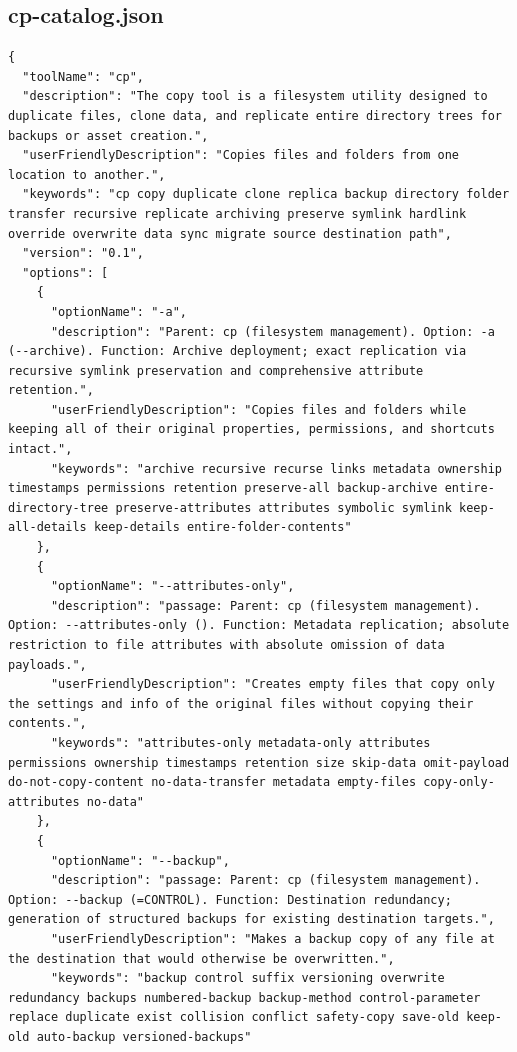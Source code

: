\begin{appendix}
\subsection{cp-catalog.json}
\begin{lstlisting}
{
  "toolName": "cp",
  "description": "The copy tool is a filesystem utility designed to duplicate files, clone data, and replicate entire directory trees for backups or asset creation.",
  "userFriendlyDescription": "Copies files and folders from one location to another.",
  "keywords": "cp copy duplicate clone replica backup directory folder transfer recursive replicate archiving preserve symlink hardlink override overwrite data sync migrate source destination path",
  "version": "0.1",
  "options": [
    {
      "optionName": "-a",
      "description": "Parent: cp (filesystem management). Option: -a (--archive). Function: Archive deployment; exact replication via recursive symlink preservation and comprehensive attribute retention.",
      "userFriendlyDescription": "Copies files and folders while keeping all of their original properties, permissions, and shortcuts intact.",
      "keywords": "archive recursive recurse links metadata ownership timestamps permissions retention preserve-all backup-archive entire-directory-tree preserve-attributes attributes symbolic symlink keep-all-details keep-details entire-folder-contents"
    },
    {
      "optionName": "--attributes-only",
      "description": "passage: Parent: cp (filesystem management). Option: --attributes-only (). Function: Metadata replication; absolute restriction to file attributes with absolute omission of data payloads.",
      "userFriendlyDescription": "Creates empty files that copy only the settings and info of the original files without copying their contents.",
      "keywords": "attributes-only metadata-only attributes permissions ownership timestamps retention size skip-data omit-payload do-not-copy-content no-data-transfer metadata empty-files copy-only-attributes no-data"
    },
    {
      "optionName": "--backup",
      "description": "passage: Parent: cp (filesystem management). Option: --backup (=CONTROL). Function: Destination redundancy; generation of structured backups for existing destination targets.",
      "userFriendlyDescription": "Makes a backup copy of any file at the destination that would otherwise be overwritten.",
      "keywords": "backup control suffix versioning overwrite redundancy backups numbered-backup backup-method control-parameter replace duplicate exist collision conflict safety-copy save-old keep-old auto-backup versioned-backups"

\end{lstlisting}
\end{appendix}
